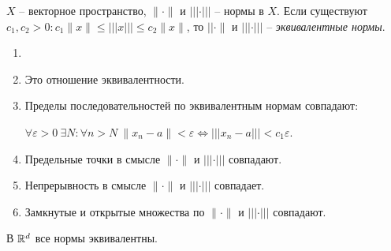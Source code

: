 \begin{definition}
    $X$ – векторное пространство, $\|\cdot \|$ и $|||\cdot |||$ – нормы в $X$. Если существуют $c_1, c_2>0:c_1\|x\|\leq |||x|||\leq c_2\|x\|$, то $||\cdot \|$ и $|||\cdot |||$ – \textit{эквивалентные нормы}.
\end{definition}

\begin{remark}
    \begin{enumerate}
        \item[]
        \item Это отношение эквивалентности.
        \item Пределы последовательностей по эквивалентным нормам совпадают:

        $\forall \varepsilon >0\ \exists N: \forall n > N\ \|x_n-a\|<\varepsilon\Leftrightarrow |||x_n-a|||<c_1\varepsilon$.

        \item Предельные точки в смысле $\|\cdot \|$ и $|||\cdot |||$ совпадают.

        \item Непрерывность в смысле $\|\cdot \|$ и $|||\cdot |||$ совпадает.

        \item Замкнутые и открытые множества по $\|\cdot \|$ и $|||\cdot |||$ совпадают.
    \end{enumerate}
\end{remark}

\begin{theorem}
    В $\mathbb{R}^d$ все нормы эквивалентны.
\end{theorem}


